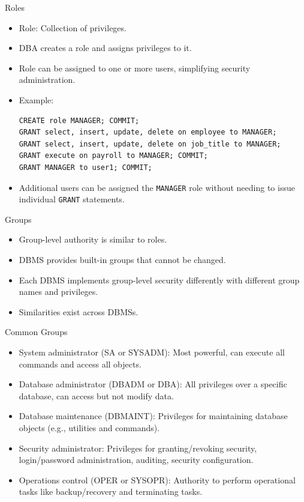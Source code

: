 \documentclass{beamer}
\begin{document}
\begin{frame}[fragile]{Roles}
    \begin{itemize}
        \item Role: Collection of privileges.
        \item DBA creates a role and assigns privileges to it.
        \item Role can be assigned to one or more users, simplifying security administration.
        \item Example:
            {\scriptsize
                \begin{verbatim}
CREATE role MANAGER; COMMIT;
GRANT select, insert, update, delete on employee to MANAGER;
GRANT select, insert, update, delete on job_title to MANAGER;
GRANT execute on payroll to MANAGER; COMMIT;
GRANT MANAGER to user1; COMMIT;
                \end{verbatim}
            }
        \item Additional users can be assigned the \texttt{MANAGER} role without needing to issue individual \texttt{GRANT} statements.
    \end{itemize}
\end{frame}

\begin{frame}{Groups}
    \begin{itemize}
        \item Group-level authority is similar to roles.
        \item DBMS provides built-in groups that cannot be changed.
        \item Each DBMS implements group-level security differently with different group names and privileges.
        \item Similarities exist across DBMSs.
    \end{itemize}
\end{frame}

\begin{frame}{Common Groups}
    \begin{itemize}
        \item System administrator (SA or SYSADM): Most powerful, can execute all commands and access all objects.
        \item Database administrator (DBADM or DBA): All privileges over a specific database, can access but not modify data.
        \item Database maintenance (DBMAINT): Privileges for maintaining database objects (e.g., utilities and commands).
        \item Security administrator: Privileges for granting/revoking security, login/password administration, auditing, security configuration.
        \item Operations control (OPER or SYSOPR): Authority to perform operational tasks like backup/recovery and terminating tasks.
    \end{itemize}
\end{frame}
\end{document}
